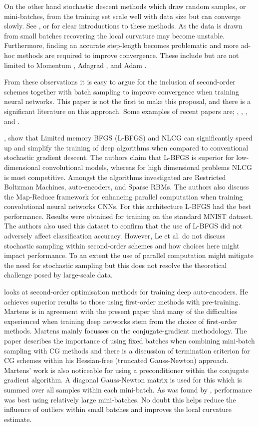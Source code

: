 \documentclass[nohyperref]{article}
\theoremstyle{plain}
\theoremstyle{definition}
\theoremstyle{remark}
\begin{document}
On the other hand stochastic descent methods which draw random samples, or mini-batches, from the training set scale well with data size but can converge slowly. See \citet{Goodfellow-et-al-2016}, \citet{Hinton:SGD} or \citet{Ruder:Overview} for clear introductions to these methods. As the data is drawn from small batches recovering the local curvature may become unstable. Furthermore, finding an accurate step-length becomes problematic and more ad-hoc methods are required to improve convergence. These include but are not limited to Momentum \cite{Momentum:Qian}, Adagrad \cite{adagrad:Duchi}, and Adam \cite{adam:Kingma}.

From these observations it is easy to argue for the inclusion of second-order schemes together with batch sampling to improve convergence when training neural networks. This paper is not the first to make this proposal, and there is a significant literature on this approach. Some examples of recent papers are;  \citet{Asi:BetterStoch}, \citet{Le:OptDeep}, \citet{Martens:Deep}, \citet{Xu:2ndNCML} and  \citet{Zhao:SLBFGS}.

\citet{Le:OptDeep}, show that Limited memory BFGS (L-BFGS) and NLCG can significantly speed up and simplify the training of deep algorithms when compared to conventional stochastic gradient descent. The authors claim that L-BFGS is superior for low-dimensional convolutional models, whereas for high dimensional problems NLCG is most competitive. Amongst the algorithms investigated are Restricted Boltzman Machines, auto-encoders, and Sparse RBMs. The authors also discuss the Map-Reduce framework for enhancing parallel computation when training convolutional neural networks CNNs. For this architecture L-BFGS had the best performance. Results were obtained for training on the standard MNIST dataset. The authors also used this dataset to confirm that the use of L-BFGS did not adversely affect classification accuracy. However, Le et al. do not discuss stochastic sampling within second-order schemes and how choices here might impact performance. To an extent the use of parallel computation might mitigate the need for stochastic sampling but this does not resolve the theoretical challenge posed by large-scale data.

\citet{Martens:Deep} looks at second-order optimisation methods for training deep auto-encoders. He achieves superior results to those using first-order methods with pre-training. Martens is in agreement with the present paper that many of the difficulties experienced when training deep networks stem from the choice of first-order methods. Martens mainly focusses on the conjugate-gradient methodology. The paper describes the importance of using fixed batches when combining mini-batch sampling with CG methods and there is a discussion of termination criterion for CG schemes within his Hessian-free (truncated Gauss-Newton) approach. Martens' work is also noticeable for using a preconditioner within the conjugate gradient algorithm. A diagonal Gauss-Newton matrix is used for this which is summed over all samples within each mini-batch. As was found by \citet{Le:OptDeep}, performance was best using relatively large mini-batches. No doubt this helps reduce the influence of outliers within small batches and improves the local curvature estimate.
\end{document}
